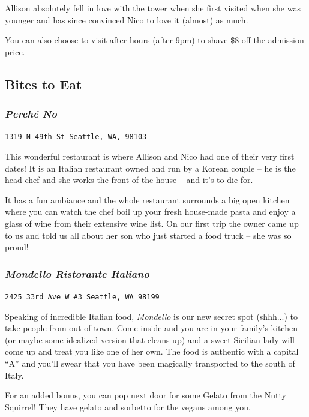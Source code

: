 \documentclass[12pt]{article}
\begin{document}
Allison absolutely fell in love with the tower when she first visited when she was younger
and has since convinced Nico to love it (almost) as much.

You can also choose to visit after hours (after 9pm) to shave \$8 off the admission price.

\newpage
\noindent\hrulefill

\subsection{Bites to Eat}
\label{subsec-bites}

\subsubsection{\textit{Perch\'e No}}
\begin{center}
    \texttt{1319 N 49th St Seattle, WA, 98103}
\end{center}
This wonderful restaurant is where Allison and Nico had one of their very first dates!
It is an Italian restaurant owned and run by a Korean couple -- he is the head chef and 
she works the front of the house -- and it's to die for. 

It has a fun ambiance and the whole restaurant surrounds a big open kitchen where you can 
watch the chef boil up your fresh house-made pasta and enjoy a glass of wine from their 
extensive wine list. On our first trip the owner came up to us and told us all about her son 
who just started a food truck -- she was so proud!

\subsubsection{\textit{Mondello Ristorante Italiano}}
\begin{center}
    \texttt{2425 33rd Ave W \#3 Seattle, WA 98199}
\end{center}
Speaking of incredible Italian food, \textit{Mondello} is our new secret spot (shhh...) 
to take people from out of town. Come inside and you are in your family's kitchen (or 
maybe some idealized version that cleans up) and a sweet Sicilian lady will come up and
treat you like one of her own. The food is authentic with a capital ``A'' and you'll 
swear that you have been magically transported to the south of Italy.

For an added bonus, you can pop next door for some Gelato from the Nutty Squirrel! They 
have gelato and sorbetto for the vegans among you.
\end{document}
